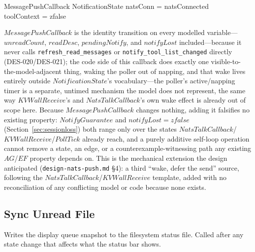 \documentclass[a4paper,10pt,fleqn]{article}
\begin{document}
\begin{schema}{MessagePushCallback}
  \Xi NotificationState
  \where
  natsConn = natsConnected \\
  toolContext = zfalse
\end{schema}

$MessagePushCallback$ is the identity transition on every modelled
variable---$unreadCount$, $readDesc$, $pendingNotify$, and $notifyLost$
included---because it never calls \texttt{refresh\_read\_messages} or
\texttt{notify\_tool\_list\_changed} directly (DES-020/DES-021); the code
side of this callback does exactly one visible-to-the-model-adjacent
thing, waking the poller out of napping, and that wake lives entirely
outside $NotificationState$'s vocabulary---the poller's active/napping
timer is a separate, untimed mechanism the model does not represent, the
same way $KVWallReceive$'s and $NatsTalkCallback$'s own wake effect is
already out of scope here.  Because $MessagePushCallback$ changes nothing,
adding it falsifies no existing property: $NotifyGuarantee$ and
$notifyLost = zfalse$ (Section~\ref{sec:sessionloss}) both range only over
the states $NatsTalkCallback$/$KVWallReceive$/$PollTick$ already reach, and
a purely additive self-loop operation cannot remove a state, an edge, or a
counterexample-witnessing path any existing $AG$/$EF$ property depends on.
This is the mechanical extension the design anticipated
(\texttt{design-nats-push.md} \S4): a third ``wake, defer the send'' source,
following the $NatsTalkCallback$/$KVWallReceive$ template, added with no
reconciliation of any conflicting model or code because none exists.

\subsection{Sync Unread File}

Writes the display queue snapshot to the filesystem status file.
Called after any state change that affects what the status bar shows.
\end{document}
